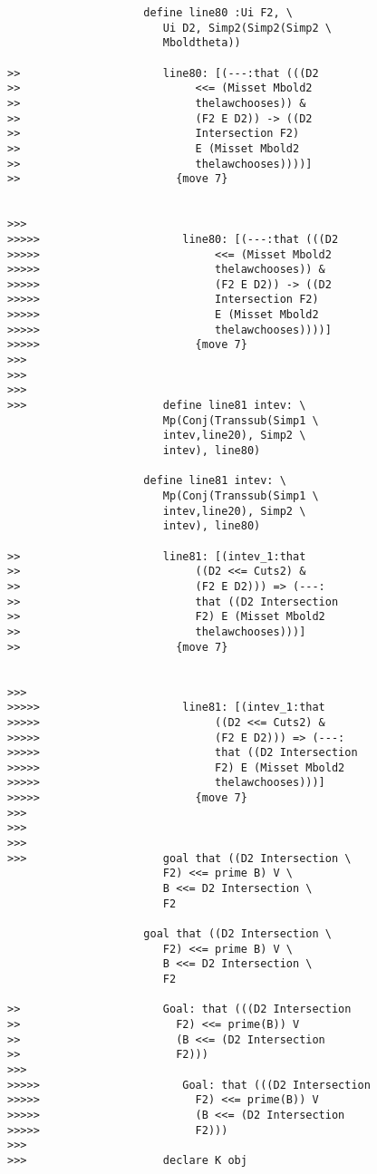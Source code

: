 \documentclass[12pt]{article}
\begin{document}
\begin{verbatim}
                     define line80 :Ui F2, \
                        Ui D2, Simp2(Simp2(Simp2 \
                        Mboldtheta))

>>                      line80: [(---:that (((D2
>>                           <<= (Misset Mbold2
>>                           thelawchooses)) &
>>                           (F2 E D2)) -> ((D2
>>                           Intersection F2)
>>                           E (Misset Mbold2
>>                           thelawchooses))))]
>>                        {move 7}


>>>
>>>>>                      line80: [(---:that (((D2
>>>>>                           <<= (Misset Mbold2
>>>>>                           thelawchooses)) &
>>>>>                           (F2 E D2)) -> ((D2
>>>>>                           Intersection F2)
>>>>>                           E (Misset Mbold2
>>>>>                           thelawchooses))))]
>>>>>                        {move 7}
>>>
>>>
>>>
>>>                     define line81 intev: \
                        Mp(Conj(Transsub(Simp1 \
                        intev,line20), Simp2 \
                        intev), line80)

                     define line81 intev: \
                        Mp(Conj(Transsub(Simp1 \
                        intev,line20), Simp2 \
                        intev), line80)

>>                      line81: [(intev_1:that
>>                           ((D2 <<= Cuts2) &
>>                           (F2 E D2))) => (---:
>>                           that ((D2 Intersection
>>                           F2) E (Misset Mbold2
>>                           thelawchooses)))]
>>                        {move 7}


>>>
>>>>>                      line81: [(intev_1:that
>>>>>                           ((D2 <<= Cuts2) &
>>>>>                           (F2 E D2))) => (---:
>>>>>                           that ((D2 Intersection
>>>>>                           F2) E (Misset Mbold2
>>>>>                           thelawchooses)))]
>>>>>                        {move 7}
>>>
>>>
>>>
>>>                     goal that ((D2 Intersection \
                        F2) <<= prime B) V \
                        B <<= D2 Intersection \
                        F2

                     goal that ((D2 Intersection \
                        F2) <<= prime B) V \
                        B <<= D2 Intersection \
                        F2

>>                      Goal: that (((D2 Intersection
>>                        F2) <<= prime(B)) V
>>                        (B <<= (D2 Intersection
>>                        F2)))
>>>
>>>>>                      Goal: that (((D2 Intersection
>>>>>                        F2) <<= prime(B)) V
>>>>>                        (B <<= (D2 Intersection
>>>>>                        F2)))
>>>
>>>                     declare K obj


\end{verbatim}
\end{document}

